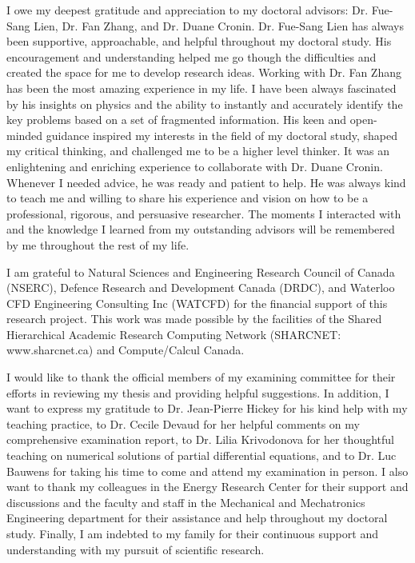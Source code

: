 \begin{acknowledgements}

    I owe my deepest gratitude and appreciation to my doctoral advisors: Dr. Fue-Sang Lien, Dr. Fan Zhang, and Dr. Duane Cronin. Dr. Fue-Sang Lien has always been supportive, approachable, and helpful throughout my doctoral study. His encouragement and understanding helped me go though the difficulties and created the space for me to develop research ideas. Working with Dr. Fan Zhang has been the most amazing experience in my life. I have been always fascinated by his insights on physics and the ability to instantly and accurately identify the key problems based on a set of fragmented information. His keen and open-minded guidance inspired my interests in the field of my doctoral study, shaped my critical thinking, and challenged me to be a higher level thinker. It was an enlightening and enriching experience to collaborate with Dr. Duane Cronin. Whenever I needed advice, he was ready and patient to help. He was always kind to teach me and willing to share his experience and vision on how to be a professional, rigorous, and persuasive researcher. The moments I interacted with and the knowledge I learned from my outstanding advisors will be remembered by me throughout the rest of my life.

    I am grateful to Natural Sciences and Engineering Research Council of Canada (NSERC), Defence Research and Development Canada (DRDC), and Waterloo CFD Engineering Consulting Inc (WATCFD) for the financial support of this research project. This work was made possible by the facilities of the Shared Hierarchical Academic Research Computing Network (SHARCNET: www.sharcnet.ca) and Compute/Calcul Canada.

    I would like to thank the official members of my examining committee for their efforts in reviewing my thesis and providing helpful suggestions. In addition, I want to express my gratitude to Dr. Jean-Pierre Hickey for his kind help with my teaching practice, to Dr. Cecile Devaud for her helpful comments on my comprehensive examination report, to Dr. Lilia Krivodonova for her thoughtful teaching on numerical solutions of partial differential equations, and to Dr. Luc Bauwens for taking his time to come and attend my examination in person. I also want to thank my colleagues in the Energy Research Center for their support and discussions and the faculty and staff in the Mechanical and Mechatronics Engineering department for their assistance and help throughout my doctoral study. Finally, I am indebted to my family for their continuous support and understanding with my pursuit of scientific research.

\end{acknowledgements}
